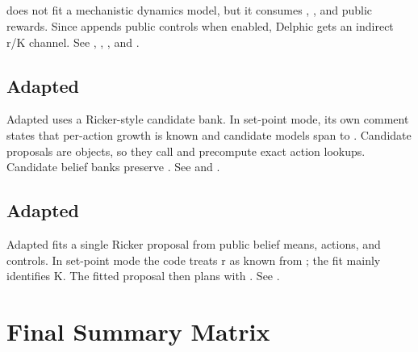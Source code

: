 \documentclass[11pt]{article}
\begin{document}
\subsection{}

 does not fit a mechanistic dynamics model, but it consumes
, , and public rewards. Since
 appends public controls when enabled, Delphic gets
an indirect r/K channel. See , ,
, and .

\subsection{Adapted }

Adapted  uses a Ricker-style candidate bank. In set-point mode, its
own comment states that per-action growth is known and candidate models span
 to . Candidate proposals are
 objects, so they call  and
precompute exact action lookups. Candidate belief banks preserve
. See  and
.

\subsection{Adapted }

Adapted  fits a single Ricker proposal from public belief means,
actions, and controls. In set-point mode the code treats r as known from
; the fit mainly identifies K. The fitted proposal then plans with
. See .

\section{Final Summary Matrix}
\end{document}

